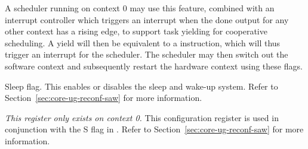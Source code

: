 A scheduler running on context 0 may use this feature, combined with an
interrupt controller which triggers an interrupt when the done output for any
other context has a rising edge, to support task yielding for cooperative
scheduling. A yield will then be equivalent to a  instruction, which
will thus trigger an interrupt for the scheduler. The scheduler may then
switch out the software context and subsequently restart the hardware context
using these flags.

\debugCanWrite{}
\coreCanWrite{}
Sleep flag. This enables or disables the sleep and wake-up system. Refer to
Section~\ref{sec:core-ug-reconf-saw} for more information.


\emph{This register only exists on context 0.} This configuration register is 
used in conjunction with the S flag in . Refer to
Section~\ref{sec:core-ug-reconf-saw} for more information.

\coreCanWrite{}
\debugCanWrite{}

